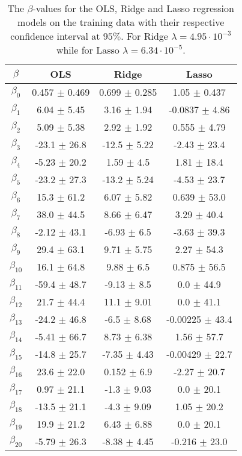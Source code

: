 \documentclass[uio,jmp,amsmath,amssymb,reprint,nofootinbib]{revtex4-1}
\numberwithin{equation}{section}
\begin{document}
\begin{table}
\begin{tabular}{|c|c|c|c|}\hline
\(\beta\) & OLS & Ridge & Lasso \\ \hline
\(\beta_{0}\) & 0.457 \(\pm\) 0.469 & 0.699 \(\pm\) 0.285 & 1.05 \(\pm\) 0.437 \\ \hline
\(\beta_{1}\) & 6.04 \(\pm\) 5.45 & 3.16 \(\pm\) 1.94 & -0.0837 \(\pm\) 4.86 \\ \hline
\(\beta_{2}\) & 5.09 \(\pm\) 5.38 & 2.92 \(\pm\) 1.92 & 0.555 \(\pm\) 4.79 \\ \hline
\(\beta_{3}\) & -23.1 \(\pm\) 26.8 & -12.5 \(\pm\) 5.22 & -2.43 \(\pm\) 23.4 \\ \hline
\(\beta_{4}\) & -5.23 \(\pm\) 20.2 & 1.59 \(\pm\) 4.5 & 1.81 \(\pm\) 18.4 \\ \hline
\(\beta_{5}\) & -23.2 \(\pm\) 27.3 & -13.2 \(\pm\) 5.24 & -4.53 \(\pm\) 23.7 \\ \hline
\(\beta_{6}\) & 15.3 \(\pm\) 61.2 & 6.07 \(\pm\) 5.82 & 0.639 \(\pm\) 53.0 \\ \hline
\(\beta_{7}\) & 38.0 \(\pm\) 44.5 & 8.66 \(\pm\) 6.47 & 3.29 \(\pm\) 40.4 \\ \hline
\(\beta_{8}\) & -2.12 \(\pm\) 43.1 & -6.93 \(\pm\) 6.5 & -3.63 \(\pm\) 39.3 \\ \hline
\(\beta_{9}\) & 29.4 \(\pm\) 63.1 & 9.71 \(\pm\) 5.75 & 2.27 \(\pm\) 54.3 \\ \hline
\(\beta_{10}\) & 16.1 \(\pm\) 64.8 & 9.88 \(\pm\) 6.5 & 0.875 \(\pm\) 56.5 \\ \hline
\(\beta_{11}\) & -59.4 \(\pm\) 48.7 & -9.13 \(\pm\) 8.5 & 0.0 \(\pm\) 44.9 \\ \hline
\(\beta_{12}\) & 21.7 \(\pm\) 44.4 & 11.1 \(\pm\) 9.01 & 0.0 \(\pm\) 41.1 \\ \hline
\(\beta_{13}\) & -24.2 \(\pm\) 46.8 & -6.5 \(\pm\) 8.68 & -0.00225 \(\pm\) 43.4 \\ \hline
\(\beta_{14}\) & -5.41 \(\pm\) 66.7 & 8.73 \(\pm\) 6.38 & 1.56 \(\pm\) 57.7 \\ \hline
\(\beta_{15}\) & -14.8 \(\pm\) 25.7 & -7.35 \(\pm\) 4.43 & -0.00429 \(\pm\) 22.7 \\ \hline
\(\beta_{16}\) & 23.6 \(\pm\) 22.0 & 0.152 \(\pm\) 6.9 & -2.27 \(\pm\) 20.7 \\ \hline
\(\beta_{17}\) & 0.97 \(\pm\) 21.1 & -1.3 \(\pm\) 9.03 & 0.0 \(\pm\) 20.1 \\ \hline
\(\beta_{18}\) & -13.5 \(\pm\) 21.1 & -4.3 \(\pm\) 9.09 & 1.05 \(\pm\) 20.2 \\ \hline
\(\beta_{19}\) & 19.9 \(\pm\) 21.2 & 6.43 \(\pm\) 6.88 & 0.0 \(\pm\) 20.1 \\ \hline
\(\beta_{20}\) & -5.79 \(\pm\) 26.3 & -8.38 \(\pm\) 4.45 & -0.216 \(\pm\) 23.0 \\ \hline
\end{tabular}
\caption{The \(\beta\)-values for the OLS, Ridge and Lasso regression models on the training data with their respective confidence interval at \(95\%\). For Ridge \(\lambda = 4.95\cdot 10^{-3}\) while for Lasso \(\lambda = 6.34\cdot 10^{-5}\).}
\label{tab:13}
\end{table}
\end{document}
